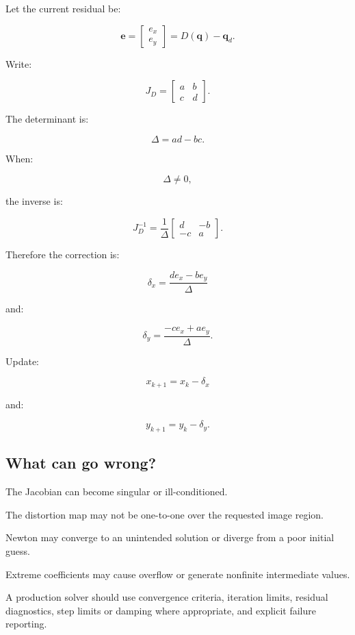 Let the current residual be:

\[
 \mathbf e= \begin{bmatrix} e_x\\e_y \end{bmatrix} = D(\mathbf q)-\mathbf q_d.
\]

Write:

\[
 J_D= \begin{bmatrix} a&b\\c&d \end{bmatrix}.
\]

The determinant is:

\[
 \boxed{ \Delta=ad-bc }.
\]

When:

\[
 \Delta\ne0,
\]

the inverse is:

\[
 J_D^{-1} = \frac1\Delta \begin{bmatrix} d&-b\\ -c&a \end{bmatrix}.
\]

Therefore the correction is:

\[
 \boxed{ \delta_x= \frac{de_x-be_y}{\Delta} }
\]

and:

\[
 \boxed{ \delta_y= \frac{-ce_x+ae_y}{\Delta} }.
\]

Update:

\[
 \boxed{ x_{k+1}=x_k-\delta_x }
\]

and:

\[
 \boxed{ y_{k+1}=y_k-\delta_y }.
\]

\subsection{What can go wrong?}\label{02-foundations-ii-ch035-what-can-go-wrong}

The Jacobian can become singular or ill-conditioned.

The distortion map may not be one-to-one over the requested image region.

Newton may converge to an unintended solution or diverge from a poor initial guess.

Extreme coefficients may cause overflow or generate nonfinite intermediate values.

A production solver should use convergence criteria, iteration limits, residual diagnostics, step limits or damping where appropriate, and explicit failure reporting.

